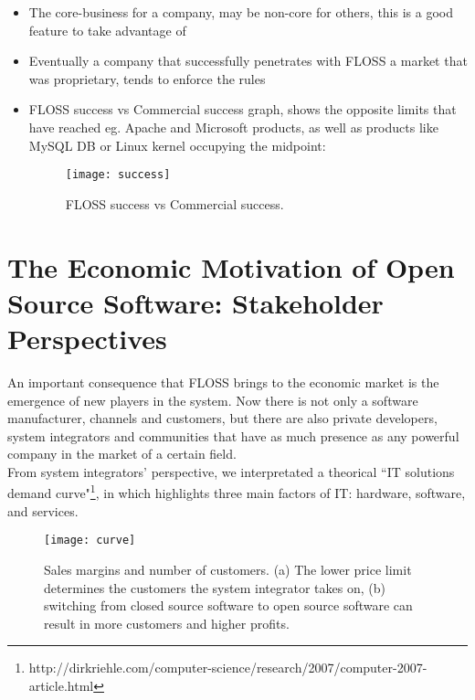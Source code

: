 \begin{itemize}
\item The core-business for a company, may be non-core for others, this is a good feature to take advantage of
\item Eventually a company that successfully penetrates with FLOSS a market that was proprietary, tends to enforce the rules
\item FLOSS success vs Commercial success graph, shows the opposite limits that have reached eg. Apache and Microsoft products, as well as products like MySQL DB or Linux kernel occupying the midpoint:
\begin{figure}[h]
\begin{center}
\texttt{[image: success]}
\caption{FLOSS success vs Commercial success.}
\label{fig:success}
\end{center}
\end{figure}
\end{itemize}


\section{The Economic Motivation of Open Source Software: Stakeholder Perspectives}\label{Part II}

An important consequence that FLOSS brings to the economic market is the emergence of new players in the system. Now there is not only a software manufacturer, channels and customers, but there are also private developers, system integrators and communities that have as much presence as any powerful company in the market of a certain field.\\

From system integrators' perspective, we interpretated a theorical \textquotedblleft IT solutions demand curve"\footnote{http://dirkriehle.com/computer-science/research/2007/computer-2007-article.html}, in which highlights three main factors of IT: hardware, software, and services.\\

\begin{figure}[h]
\begin{center}
\texttt{[image: curve]}
\caption{Sales margins and number of customers. (a) The lower price limit determines the customers the system integrator takes on, (b) switching from closed source software to open source software can result in more customers and higher profits.}
\label{fig:curve}
\end{center}
\end{figure}

